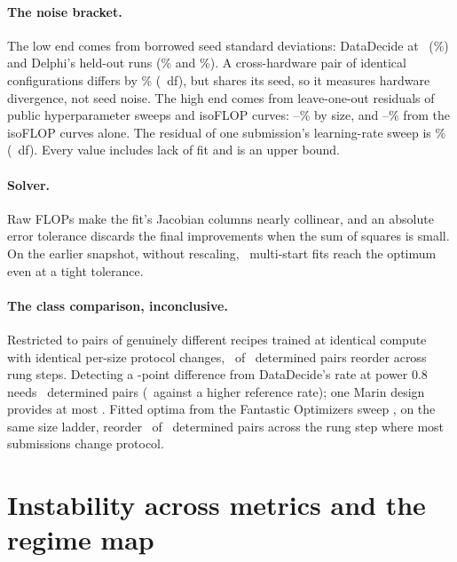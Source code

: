 \paragraph{The noise bracket.} The low end comes from borrowed seed standard
deviations: DataDecide at \targetScaleLabel\ (\noiseLowDataDecide\%) and Delphi's
held-out runs (\noiseLowDelphiA\% and \noiseLowDelphiB\%). A cross-hardware pair
of identical configurations differs by \noiseHardware\% (\noiseHardwareDf\ df),
but shares its seed, so it measures hardware divergence, not seed noise. The
high end comes from leave-one-out residuals of public hyperparameter sweeps and
isoFLOP curves: \marinBoundLow--\marinBoundHigh\% by size, and
\noiseHighDelphiMin--\noiseHighDelphiMax\% from the isoFLOP curves alone. The
residual of one submission's learning-rate sweep is \noiseSweepResidual\%
(\noiseSweepDf\ df). Every value includes lack of fit and is an upper bound.

\paragraph{Solver.} Raw FLOPs make the fit's Jacobian columns nearly collinear,
and an absolute error tolerance discards the final improvements when the sum of
squares is small. On the earlier snapshot, without rescaling,
\marinUnscaledReached\ multi-start fits reach the optimum even at a tight
tolerance.

\paragraph{The class comparison, inconclusive.} Restricted to pairs of
genuinely different recipes trained at identical compute with identical
per-size protocol changes, \marinMatchedReordered\ of \marinMatchedDetermined\
determined pairs reorder across rung steps. Detecting a \marinPowerDelta-point
difference from DataDecide's rate at power 0.8 needs \marinPowerN\ determined  %
pairs (\marinPowerNHigh\ against a higher reference rate); one Marin design
provides at most \marinMaxDetermined. Fitted optima from the Fantastic Optimizers
sweep \citep{wen2025fantastic}, on the same size ladder, reorder
\marinFoReordered\ of \marinFoDetermined\ determined pairs across the rung step
where most submissions change protocol.

\FloatBarrier
\section{Instability across metrics and the regime map}
\label{app:regime}

